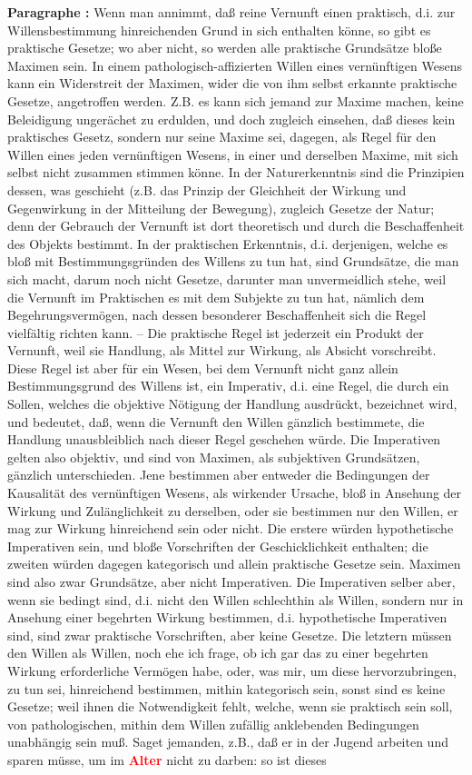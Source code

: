 \documentclass[a4paper,12pt,twoside]{book}
\newcommand{\match}[1]{\textcolor{red}{\textbf{#1}}}
\begin{document}
	\noindent\textbf{Paragraphe : }Wenn man annimmt, daß reine Vernunft einen praktisch, d.i. zur Willensbestimmung hinreichenden Grund in sich enthalten könne, so gibt es praktische Gesetze; wo aber nicht, so werden alle praktische Grundsätze bloße Maximen sein. In einem pathologisch-affizierten Willen eines vernünftigen Wesens kann ein Widerstreit der Maximen, wider die von ihm selbst erkannte praktische Gesetze, angetroffen werden. Z.B. es kann sich jemand zur Maxime machen, keine Beleidigung ungerächet zu erdulden, und doch zugleich einsehen, daß dieses kein praktisches Gesetz, sondern nur seine Maxime sei, dagegen, als Regel für den Willen eines jeden vernünftigen Wesens, in einer und derselben Maxime, mit sich selbst nicht zusammen stimmen könne. In der Naturerkenntnis sind die Prinzipien dessen, was geschieht (z.B. das Prinzip der Gleichheit der Wirkung und Gegenwirkung in der Mitteilung der Bewegung), zugleich Gesetze der Natur; denn der Gebrauch der Vernunft ist dort theoretisch und durch die Beschaffenheit des Objekts bestimmt. In der praktischen Erkenntnis, d.i. derjenigen, welche es bloß mit Bestimmungsgründen des Willens zu tun  hat, sind Grundsätze, die man sich macht, darum noch nicht Gesetze, darunter man unvermeidlich stehe, weil die Vernunft im Praktischen es mit dem Subjekte zu tun hat, nämlich dem Begehrungsvermögen, nach dessen besonderer Beschaffenheit sich die Regel vielfältig richten kann. – Die praktische Regel ist jederzeit ein Produkt der Vernunft, weil sie Handlung, als Mittel zur Wirkung, als Absicht vorschreibt. Diese Regel ist aber für ein Wesen, bei dem Vernunft nicht ganz allein Bestimmungsgrund des Willens ist, ein Imperativ, d.i. eine Regel, die durch ein Sollen, welches die objektive Nötigung der Handlung ausdrückt, bezeichnet wird, und bedeutet, daß, wenn die Vernunft den Willen gänzlich bestimmete, die Handlung unausbleiblich nach dieser Regel geschehen würde. Die Imperativen gelten also objektiv, und sind von Maximen, als subjektiven Grundsätzen, gänzlich unterschieden. Jene bestimmen aber entweder die Bedingungen der Kausalität des vernünftigen Wesens, als wirkender Ursache, bloß in Ansehung der Wirkung und Zulänglichkeit zu derselben, oder sie bestimmen nur den Willen, er mag zur Wirkung hinreichend sein oder nicht. Die erstere würden hypothetische Imperativen sein, und bloße Vorschriften der Geschicklichkeit enthalten; die zweiten würden dagegen kategorisch und allein praktische Gesetze sein. Maximen sind also zwar Grundsätze, aber nicht Imperativen. Die Imperativen selber aber, wenn sie bedingt sind, d.i. nicht den Willen schlechthin als Willen, sondern nur in Ansehung einer begehrten Wirkung bestimmen, d.i. hypothetische Imperativen sind, sind zwar praktische Vorschriften, aber keine Gesetze. Die letztern müssen den Willen als Willen, noch ehe ich frage, ob ich gar das zu einer begehrten Wirkung erforderliche Vermögen habe, oder, was mir, um diese hervorzubringen, zu tun sei, hinreichend bestimmen, mithin kategorisch sein, sonst sind es keine Gesetze; weil ihnen die Notwendigkeit fehlt, welche, wenn sie praktisch sein soll, von pathologischen, mithin dem Willen zufällig anklebenden Bedingungen unabhängig sein muß. Saget jemanden, z.B., daß er in der Jugend arbeiten und sparen müsse, um im \match{Alter} nicht  zu darben: so ist dieses 
\end{document}
